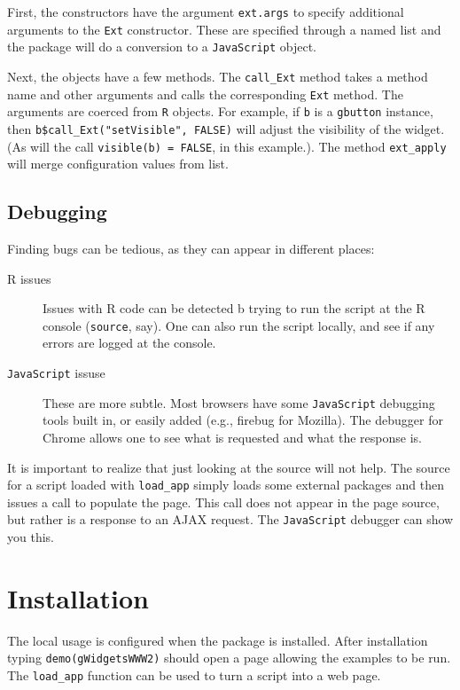 \documentclass[12pt]{article}
\newcommand{\code}[1]{\texttt{#1}}
\newcommand{\proglang}[1]{\code{#1}}
\newcommand{\R}{\proglang{R}}
\newcommand{\javascript}{\proglang{JavaScript}}
\begin{document}
First, the constructors have the argument \code{ext.args} to specify
additional arguments to the \code{Ext} constructor. These are
specified through a named list and the package will do a conversion to
a \javascript{} object.

Next, the objects have a few methods. The \code{call\_Ext} method
takes a method name and other arguments and calls the corresponding
\code{Ext} method. The arguments are coerced from \R\/ objects. For
example, if \code{b} is a \code{gbutton} instance, then
\code{b\$call\_Ext("setVisible", FALSE)} will adjust the visibility of
the widget. (As will the call \code{visible(b) = FALSE}, in this
example.). The method \code{ext\_apply} will merge configuration
values from list.


\subsection{Debugging}
\label{sec:debugging}

Finding bugs can be tedious, as they can appear in different places:
\begin{description}
\item[R issues] Issues with R code can be detected b trying to run the
  script at the R console (\code{source}, say). One can also run the
  script locally, and see if any errors are logged at the console.
\item[\javascript{} issuse] These are more subtle. Most browsers have
  some \javascript{} debugging tools built in, or easily added (e.g.,
  firebug for Mozilla). The debugger for Chrome allows one to see what
  is requested and what the response is. 
\end{description}
It is important to realize that just looking at the source will not
help. The source for a script loaded with \code{load\_app} simply
loads some external packages and then issues a call to populate the
page. This call does not appear in the page source, but rather is a
response to an AJAX request. The \javascript{} debugger can show you this.







\section{Installation}
The local usage is configured when the package is installed. After
installation typing \code{demo(gWidgetsWWW2)} should open a page
allowing the examples to be run. The \code{load\_app} function can be
used to turn a script into a web page.
\end{document}
